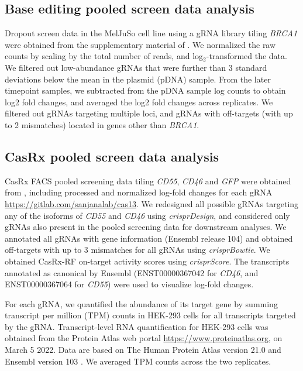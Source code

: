 \documentclass[pdftex,english,10pt]{article}
\begin{document}
{%
\subsection*{Base editing pooled screen data analysis}

Dropout screen data in the MelJuSo cell line using a gRNA library tiling \textit{BRCA1} were obtained from the supplementary material of \citet{hanna2021massively}. We normalized the raw counts by scaling by the total number of reads, and log$_2$-transformed the data. We filtered out low-abundance gRNAs that were further than 3 standard deviations below the mean in the plasmid (pDNA) sample. From the later timepoint samples, we subtracted from the pDNA sample log counts to obtain log2 fold changes, and averaged the log2 fold changes across replicates. 
We filtered out gRNAs targeting multiple loci, and gRNAs with off-targets (with up to 2 mismatches) located in genes other than \textit{BRCA1}.  




\subsection*{CasRx pooled screen data analysis}

CasRx FACS pooled screening data tiling \textit{CD55}, \textit{CD46} and \textit{GFP} were obtained from \citet{wessels2020massively}, including processed and normalized log-fold changes for each gRNA \url{https://gitlab.com/sanjanalab/cas13}. We redesigned all possible gRNAs targeting any of the isoforms of \textit{CD55} and \textit{CD46} using \textit{crisprDesign}, and considered only gRNAs also present in the pooled screening data for downstream analyses. We annotated all gRNAs with gene information (Ensembl release 104) and obtained off-targets with up to 3 mismatches for all gRNAs using \textit{crisprBowtie}. 
We obtained CasRx-RF on-target activity scores using \textit{crisprScore}. 
The transcripts annotated as canonical by Ensembl (ENST00000367042 for \textit{CD46}, and ENST00000367064 for \textit{CD55}) were used to visualize log-fold changes. 

For each gRNA, we quantified the abundance of its target gene by summing transcript per million (TPM) counts in HEK-293 cells for all transcripts targeted by the gRNA. Transcript-level RNA quantification for HEK-293 cells was obtained from the Protein Atlas web portal \url{https://www.proteinatlas.org},
on March 5 2022. Data are based on The Human Protein Atlas version 21.0 and Ensembl version 103 .
We averaged TPM counts across the two replicates. 

}
\end{document}
